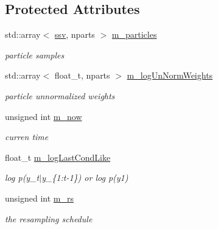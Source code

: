 \subsection*{Protected Attributes}
\begin{DoxyCompactItemize}
\item 
\mbox{\label{classAPF_ab1af862a00bf3d1b782b52c8996bf83f}} 
std\+::array$<$ \hyperlink{classAPF_a5f96da87f00ff75af1232f9021daf06a}{ssv}, nparts $>$ \hyperlink{classAPF_ab1af862a00bf3d1b782b52c8996bf83f}{m\+\_\+particles}
\begin{DoxyCompactList}\small\item\em particle samples \end{DoxyCompactList}\item 
\mbox{\label{classAPF_a23f21a7901654d04256d5aa316afc386}} 
std\+::array$<$ float\+\_\+t, nparts $>$ \hyperlink{classAPF_a23f21a7901654d04256d5aa316afc386}{m\+\_\+log\+Un\+Norm\+Weights}
\begin{DoxyCompactList}\small\item\em particle unnormalized weights \end{DoxyCompactList}\item 
\mbox{\label{classAPF_a531ab23480d146ef4b15b0cd1991e609}} 
unsigned int \hyperlink{classAPF_a531ab23480d146ef4b15b0cd1991e609}{m\+\_\+now}
\begin{DoxyCompactList}\small\item\em curren time \end{DoxyCompactList}\item 
\mbox{\label{classAPF_a80465854e52cb31c53fa68bf66aad210}} 
float\+\_\+t \hyperlink{classAPF_a80465854e52cb31c53fa68bf66aad210}{m\+\_\+log\+Last\+Cond\+Like}
\begin{DoxyCompactList}\small\item\em log p(y\+\_\+t$\vert$y\+\_\+\{1\+:t-\/1\}) or log p(y1) \end{DoxyCompactList}\item 
\mbox{\label{classAPF_a2969bd3bee4467a47324862fefdfc693}} 
unsigned int \hyperlink{classAPF_a2969bd3bee4467a47324862fefdfc693}{m\+\_\+rs}
\begin{DoxyCompactList}\small\item\em the resampling schedule \end{DoxyCompactList}\item 

\end{DoxyCompactItemize}
